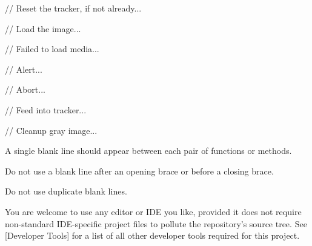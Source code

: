     // Reset the tracker, if not already...

    // Load the image...

        // Failed to load media...

            // Alert...

            // Abort...

    // Feed into tracker...
    
    // Cleanup gray image...
\stoptyping
\StopCodeExample

\item
A single blank line should appear between each pair of functions or methods. 

\item
Do not use a blank line after an opening brace or before a closing brace.

\item
Do not use duplicate blank lines.
\stopitemize


You are welcome to use any editor or IDE you like, provided it does not require non-standard IDE-specific project files to pollute the repository's source tree. See [Developer Tools] for a list of all other developer tools required for this project.

